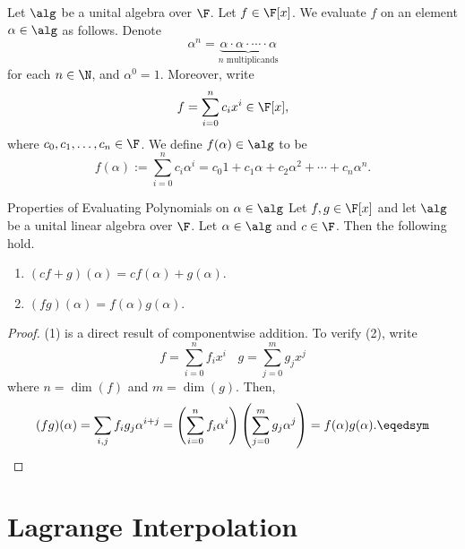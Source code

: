 \documentclass[linearalgebraII]{subfiles}
\begin{document}
    \begin{remark}
        Let $\alg$ be a unital algebra over $\F$. Let $f\in \F[x]$. We evaluate $f$ on an element $\alpha\in \alg$ as follows. Denote
        \begin{equation*}
            \alpha^n = \underbrace{\alpha\cdot\alpha\cdot\cdots\cdot\alpha}_{n\text{ multiplicands}}
        \end{equation*}
        for each $n\in \N$, and $\alpha^0 = 1$. Moreover, write
        \begin{equation*}
            f = \sum^n_{i=0} c_ix^i\in \F[x],
        \end{equation*}
        where $c_0, c_1, \ldots, c_n\in\F$. We define $f(\alpha)\in\alg$ to be
        \begin{equation*}
            f(\alpha) := \sum^n_{i=0} c_i\alpha^i = c_0 1 + c_1\alpha + c_2\alpha^2 + \cdots + c_n\alpha^n.
        \end{equation*}
    \end{remark}

    \begin{prop}{Properties of Evaluating Polynomials on $\alpha\in\alg$}
        Let $f,g\in \F[x]$ and let $\alg$ be a unital linear algebra over $\F$. Let $\alpha\in \alg$ and $c\in\F$. Then the following hold.
        \begin{enumerate}
            \item $(cf+g)(\alpha) = cf(\alpha)+g(\alpha)$.
            \item $(fg)(\alpha) = f(\alpha)g(\alpha)$.
        \end{enumerate}
    \end{prop}

    \begin{proof}
        (1) is a direct result of componentwise addition. To verify (2), write
        \begin{equation*}
            f = \sum^n_{i=0} f_ix^i \ \ \ \ g = \sum^m_{j=0} g_jx^j
        \end{equation*}
        where $n = \dim(f)$ and $m = \dim(g)$. Then,
        \begin{equation*}
            (fg)(\alpha) = \sum_{i,j} f_ig_j\alpha^{i+j} = \left( \sum^n_{i=0} f_i\alpha^i \right)\left( \sum^m_{j=0} g_j\alpha^j \right) = f(\alpha)g(\alpha). \eqedsym
        \end{equation*}
    \end{proof}

    \section{Lagrange Interpolation}
\end{document}
